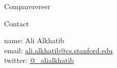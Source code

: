 \documentclass{beamer}
\begin{document}
\begin{frame}{Comparerereer}



\end{frame}






\begin{frame}{Contact}

    name: {Ali Alkhatib} \\
    email: \href{mailto:ali.alkhatib@cs.stanford.edu}{ali.alkhatib@cs.stanford.edu} \\
    twitter: \href{https://twitter.com/_alialkhatib}{@\_alialkhatib} \\
\end{frame}


% 
\printbibliography{}
\end{document}
